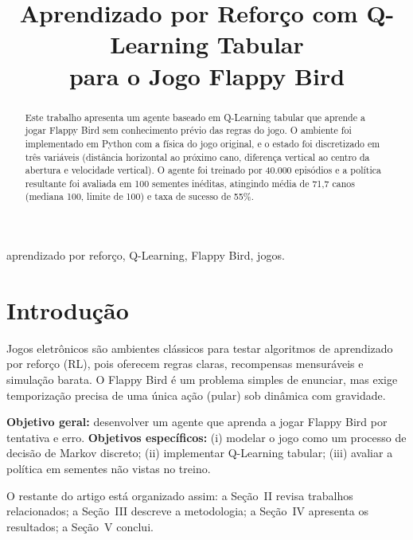 \documentclass[conference]{IEEEtran}
\begin{document}
\title{Aprendizado por Reforço com Q-Learning Tabular\\para o Jogo Flappy Bird}

\author{
}

\maketitle

\begin{abstract}
Este trabalho apresenta um agente baseado em Q-Learning tabular que aprende a jogar Flappy Bird sem conhecimento prévio das regras do jogo. O ambiente foi implementado em Python com a física do jogo original, e o estado foi discretizado em três variáveis (distância horizontal ao próximo cano, diferença vertical ao centro da abertura e velocidade vertical). O agente foi treinado por 40.000 episódios e a política resultante foi avaliada em 100 sementes inéditas, atingindo média de 71,7 canos (mediana 100, limite de 100) e taxa de sucesso de 55\%.
\end{abstract}

\begin{IEEEkeywords}
aprendizado por reforço, Q-Learning, Flappy Bird, jogos.
\end{IEEEkeywords}

\section{Introdução}
Jogos eletrônicos são ambientes clássicos para testar algoritmos de aprendizado por reforço (RL), pois oferecem regras claras, recompensas mensuráveis e simulação barata. O Flappy Bird é um problema simples de enunciar, mas exige temporização precisa de uma única ação (pular) sob dinâmica com gravidade.

\textbf{Objetivo geral:} desenvolver um agente que aprenda a jogar Flappy Bird por tentativa e erro. \textbf{Objetivos específicos:} (i) modelar o jogo como um processo de decisão de Markov discreto; (ii) implementar Q-Learning tabular; (iii) avaliar a política em sementes não vistas no treino.

O restante do artigo está organizado assim: a Seção~II revisa trabalhos relacionados; a Seção~III descreve a metodologia; a Seção~IV apresenta os resultados; a Seção~V conclui.
\end{document}

